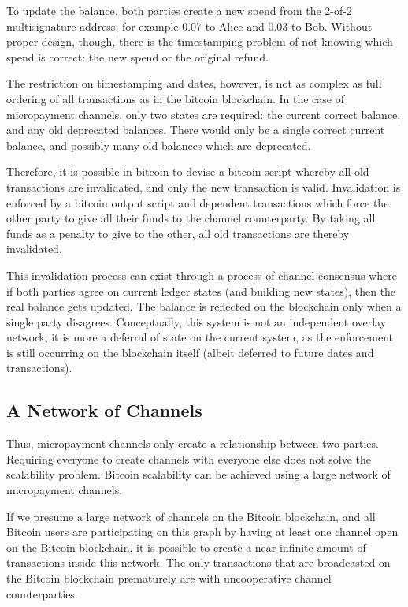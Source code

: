 \documentclass[letterpaper,11pt]{article}
\begin{document}
To update the balance, both parties create a new spend from the 2-of-2
multisignature address, for example 0.07 to Alice and 0.03 to Bob. Without
proper design, though, there is the timestamping problem of not knowing which
spend is correct: the new spend or the original refund.

The restriction on timestamping and dates, however, is not as complex as full
ordering of all transactions as in the bitcoin blockchain. In the case of
micropayment channels, only two states are required: the current correct
balance, and any old deprecated balances. There would only be a single correct
current balance, and possibly many old balances which are deprecated.

Therefore, it is possible in bitcoin to devise a bitcoin script whereby all old
transactions are invalidated, and only the new transaction is valid.
Invalidation is enforced by a bitcoin output script and dependent transactions
which force the other party to give all their funds to the channel
counterparty. By taking all funds as a penalty to give to the other, all old
transactions are thereby invalidated.

This invalidation process can exist through a process of channel consensus
where if both parties agree on current ledger states (and building new states),
then the real balance gets updated. The balance is reflected on the blockchain
only when a single party disagrees. Conceptually, this system is not an
independent overlay network; it is more a deferral of state on the current
system, as the enforcement is still occurring on the blockchain itself (albeit
deferred to future dates and transactions).

\subsection{A Network of Channels}

Thus, micropayment channels only create a relationship between two parties.
Requiring everyone to create channels with everyone else does not solve the
scalability problem. Bitcoin scalability can be achieved using a large network
of micropayment channels.

If we presume a large network of channels on the Bitcoin blockchain, and all
Bitcoin users are participating on this graph by having at least one channel
open on the Bitcoin blockchain, it is possible to create a near-infinite amount
of transactions inside this network. The only transactions that are broadcasted
on the Bitcoin blockchain prematurely are with uncooperative channel
counterparties.
\end{document}

